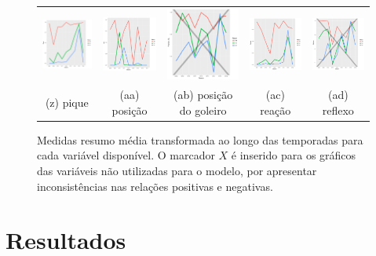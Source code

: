 \documentclass[doc,apacite,oneside,a4paper,12pt]{apa6}
\begin{document}
\begin{figure}
\begin{tabular}{ccccc}
    \includegraphics[width=25mm]{pique_result_trans_media}  & \includegraphics[width=25mm]{pos_result_trans_media} & \includegraphics[width=25mm]{posicion_gl_result_trans_media} &     \includegraphics[width=25mm]{reacao_result_trans_media}&
  \includegraphics[width=25mm]{reflexos_result_trans_media}     \\
 \scriptsize{(z) pique} & \scriptsize{(aa) posição}& \scriptsize{(ab) posição do goleiro} & \scriptsize{(ac) reação} & \scriptsize{(ad) reflexo}  \\[3pt]

\end{tabular}
    \caption[\scriptsize{Medidas resumo transformado na média.}]{\scriptsize{Medidas resumo média transformada ao longo das temporadas para cada variável disponível. O marcador $X$ é inserido para os gráficos das variáveis não utilizadas para o modelo, por apresentar inconsistências nas relações positivas e negativas.}}
    \label{fig:medresumotransmedia}
\end{figure}



\section{Resultados}
\label{sec:reslt}
\end{document}

